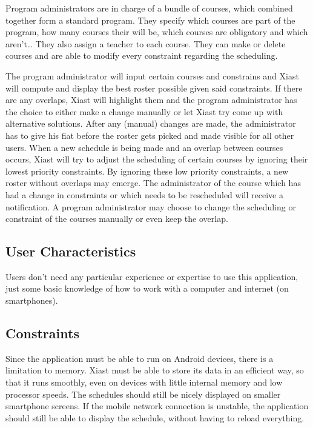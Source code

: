 \documentclass[9pt]{article}
\begin{document}
Program administrators are in charge of a bundle of courses, which
combined together form a standard program. They specify which courses
are part of the program, how many courses their will be, which courses
are obligatory and which aren't\ldots{} They also assign a teacher to
each course. They can make or delete courses and are able to modify
every constraint regarding the scheduling.

The program administrator will input certain courses and constrains and
Xiast will compute and display the best roster possible given said
constraints. If there are any overlaps, Xiast will highlight them and
the program administrator has the choice to either make a change
manually or let Xiast try come up with alternative solutions. After any
(manual) changes are made, the administrator has to give his fiat before
the roster gets picked and made visible for all other users. When a new
schedule is being made and an overlap between courses occurs, Xiast will
try to adjust the scheduling of certain courses by ignoring their lowest
priority constraints. By ignoring these low priority constraints, a new
roster without overlaps may emerge. The administrator of the course
which has had a change in constraints or which needs to be rescheduled
will receive a notification. A program administrator may choose to
change the scheduling or constraint of the courses manually or even keep
the overlap.

\subsection{User Characteristics}\label{user-characteristics}

Users don't need any particular experience or expertise to use this
application, just some basic knowledge of how to work with a computer
and internet (on smartphones).

\subsection{Constraints}\label{constraints}

Since the application must be able to run on Android devices, there is a
limitation to memory. Xiast must be able to store its data in an
efficient way, so that it runs smoothly, even on devices with little
internal memory and low processor speeds. The schedules should still be
nicely displayed on smaller smartphone screens. If the mobile network
connection is unstable, the application should still be able to display
the schedule, without having to reload everything.
\end{document}
